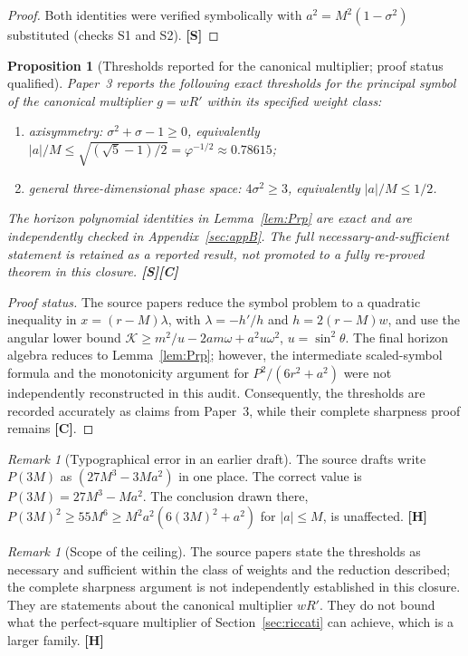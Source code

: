 \documentclass[11pt,a4paper]{article}
\newcommand{\VS}{\textcolor{vs}{\textbf{[S]}}}
\newcommand{\VH}{\textcolor{vh}{\textbf{[H]}}}
\newcommand{\CC}{\textcolor{cc}{\textbf{[C]}}}
\newtheorem{proposition}[theorem]{Proposition}
\theoremstyle{remark}
\newtheorem{remark}[theorem]{Remark}
\theoremstyle{definition}
\begin{document}
\begin{proof}
Both identities were verified symbolically with $a^2 = M^2(1-\sigma^2)$ substituted (checks S1 and S2). \VS
\end{proof}

\begin{proposition}[Thresholds reported for the canonical multiplier; proof status qualified]
\label{thm:ceil}
Paper~3 reports the following exact thresholds for the principal symbol of the canonical multiplier $g=wR'$ within its specified weight class:
\begin{enumerate}[label=(\alph*)]
\item axisymmetry: $\sigma^2+\sigma-1\ge0$, equivalently $|a|/M\le \sqrt{(\sqrt5-1)/2}=\varphi^{-1/2}\approx0.78615$;
\item general three-dimensional phase space: $4\sigma^2\ge3$, equivalently $|a|/M\le1/2$.
\end{enumerate}
The horizon polynomial identities in Lemma~\ref{lem:Prp} are exact and are independently checked in Appendix~\ref{sec:appB}. The full necessary-and-sufficient statement is retained as a \emph{reported result}, not promoted to a fully re-proved theorem in this closure. \VS\CC
\end{proposition}

\begin{proof}[Proof status]
The source papers reduce the symbol problem to a quadratic inequality in $x=(r-M)\lambda$, with $\lambda=-h'/h$ and $h=2(r-M)w$, and use the angular lower bound $\mathcal K\ge m^2/u-2am\omega+a^2u\omega^2$, $u=\sin^2\theta$. The final horizon algebra reduces to Lemma~\ref{lem:Prp}; however, the intermediate scaled-symbol formula and the monotonicity argument for $P^2/(6r^2+a^2)$ were not independently reconstructed in this audit. Consequently, the thresholds are recorded accurately as claims from Paper~3, while their complete sharpness proof remains \CC.
\end{proof}

\begin{remark}[Typographical error in an earlier draft]
The source drafts write $P(3M)$ as $(27M^3 - 3Ma^2)$ in one place. The correct value is $P(3M) = 27M^3 - Ma^2$. The conclusion drawn there, $P(3M)^2 \ge 55M^6 \ge M^2a^2(6(3M)^2+a^2)$ for $|a|\le M$, is unaffected. \VH
\end{remark}

\begin{remark}[Scope of the ceiling]
The source papers state the thresholds as necessary and sufficient within the class of weights and the reduction described; the complete sharpness argument is not independently established in this closure. They are statements about the canonical multiplier $wR'$. They do not bound what the perfect-square multiplier of Section~\ref{sec:riccati} can achieve, which is a larger family. \VH
\end{remark}
\end{document}
